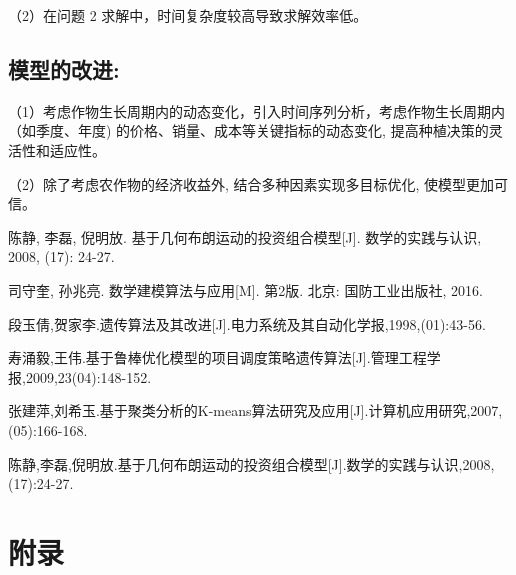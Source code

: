 \documentclass[12pt]{ctexart}
\begin{document}
	
	（2）在问题 2 求解中，时间复杂度较高导致求解效率低。
	\subsection{模型的改进:}	
	（1）考虑作物生长周期内的动态变化，引入时间序列分析，考虑作物生长周期内（如季度、年度) 的价格、销量、成本等关键指标的动态变化, 提高种植决策的灵活性和适应性。
	
	
	（2）除了考虑农作物的经济收益外, 结合多种因素实现多目标优化, 使模型更加可信。  
	
	
	
	
	\newpage
\begin{thebibliography}{9} %
	
	\bibitem{[1]} 陈静, 李磊, 倪明放. 基于几何布朗运动的投资组合模型[J]. 数学的实践与认识, 2008, (17): 24-27.   
	
	
	\bibitem{[2]} 司守奎, 孙兆亮. 数学建模算法与应用[M]. 第2版. 北京: 国防工业出版社, 2016.  
	
	
	\bibitem{[3]}段玉倩,贺家李.遗传算法及其改进[J].电力系统及其自动化学报,1998,(01):43-56.
	
	\bibitem{[4]}寿涌毅,王伟.基于鲁棒优化模型的项目调度策略遗传算法[J].管理工程学报,2009,23(04):148-152.
	
	\bibitem{[5]}张建萍,刘希玉.基于聚类分析的K-means算法研究及应用[J].计算机应用研究,2007,(05):166-168.
	
	\bibitem{[6]}陈静,李磊,倪明放.基于几何布朗运动的投资组合模型[J].数学的实践与认识,2008,(17):24-27.
\end{thebibliography} 
	 
	 
	 \newpage
	\section*{附录}  
\end{document}
